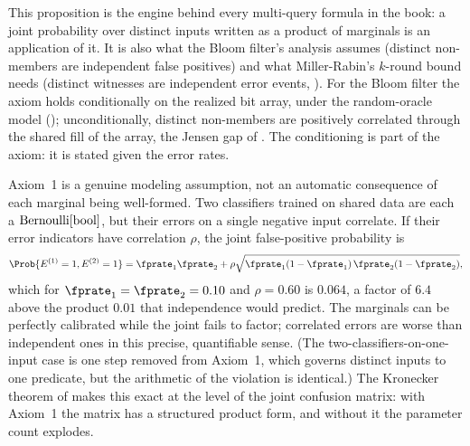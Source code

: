 This proposition is the engine behind every multi-query formula in the book: a
joint probability over distinct inputs written as a product of marginals is an
application of it. It is also what the Bloom filter's analysis assumes (distinct
non-members are independent false positives) and what Miller-Rabin's $k$-round
bound needs (distinct witnesses are independent error events,
). For the Bloom filter the axiom holds
conditionally on the realized bit array, under the random-oracle model
(); unconditionally, distinct non-members are
positively correlated through the shared fill of the array, the Jensen gap of
. The conditioning is part of the axiom: it
is stated given the error rates.

Axiom~1 is a genuine modeling assumption, not an automatic consequence of each
marginal being well-formed. Two classifiers trained on shared data are each a
$\mathrm{Bernoulli}[\mathrm{bool}]$, but their errors on a single negative input correlate.
If their error indicators have correlation $\rho$, the joint false-positive
probability is
\[
  \Prob{E^{(1)} = 1, E^{(2)} = 1}
  = \fprate_1 \fprate_2 + \rho \sqrt{\fprate_1(1 - \fprate_1)\,\fprate_2(1 -
  \fprate_2)},
\]
which for $\fprate_1 = \fprate_2 = 0.10$ and $\rho = 0.60$ is $0.064$, a factor
of $6.4$ above the product $0.01$ that independence would predict. The marginals
can be perfectly calibrated while the joint fails to factor; correlated errors
are worse than independent ones in this precise, quantifiable sense. (The
two-classifiers-on-one-input case is one step removed from Axiom~1, which
governs distinct inputs to one predicate, but the arithmetic of the violation
is identical.) The Kronecker theorem of  makes this exact at
the level of the joint confusion matrix: with Axiom~1 the matrix has a
structured product form, and without it the parameter count explodes.

